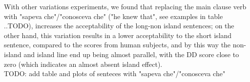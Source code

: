 \bigskip
With other variations experiments, we found that replacing the main clause verb with "sapeva che"/"conosceva che" ("he knew that", see examples in table ..TODO), increases the acceptability of the long-non island sentences; on the other hand, this variation results in a lower acceptability to the short island sentence, compared to the scores from human subjects, and by this way the non-island and island line end up being almost parallel, with the DD score close to zero (which indicates an almost absent island effect).
\\ TODO: add table and plots of senteces with  "sapeva che"/"conosceva che" 




